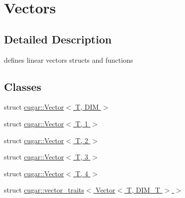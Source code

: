 \hypertarget{group___vectors_module}{}\section{Vectors}
\label{group___vectors_module}


\subsection{Detailed Description}
defines linear vectors structs and functions \subsection*{Classes}
\begin{DoxyCompactItemize}
\item 
struct \hyperlink{structcugar_1_1_vector}{cugar\+::\+Vector$<$ T, D\+I\+M $>$}
\item 
struct \hyperlink{structcugar_1_1_vector_3_01_t_00_011_01_4}{cugar\+::\+Vector$<$ T, 1 $>$}
\item 
struct \hyperlink{structcugar_1_1_vector_3_01_t_00_012_01_4}{cugar\+::\+Vector$<$ T, 2 $>$}
\item 
struct \hyperlink{structcugar_1_1_vector_3_01_t_00_013_01_4}{cugar\+::\+Vector$<$ T, 3 $>$}
\item 
struct \hyperlink{structcugar_1_1_vector_3_01_t_00_014_01_4}{cugar\+::\+Vector$<$ T, 4 $>$}
\item 
struct \hyperlink{structcugar_1_1vector__traits_3_01_vector_3_01_t_00_01_d_i_m___t_01_4_01_4}{cugar\+::vector\+\_\+traits$<$ Vector$<$ T, D\+I\+M\+\_\+\+T $>$ $>$}
\end{DoxyCompactItemize}
